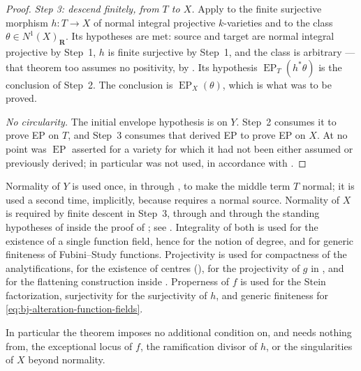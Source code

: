 \begin{proof}
\medskip
\noindent\emph{Step 3: descend finitely, from $T$ to $X$.}
Apply  to the finite surjective morphism
$h:T\to X$ of normal integral projective $k$-varieties and to the class
$\theta\in N^1(X)_{\mathbf R}$.  Its hypotheses are met: source and target
are normal integral projective by Step~1, $h$ is finite surjective by
Step~1, and the class is arbitrary --- that theorem too assumes no
positivity, by .  Its hypothesis
$\operatorname{EP}_T(h^*\theta)$ is the conclusion of Step~2.  The
conclusion is $\operatorname{EP}_X(\theta)$, which is what was to be
proved.

\medskip
\noindent\emph{No circularity.}  The initial envelope hypothesis is on $Y$.
Step~2 consumes it to prove EP on $T$, and Step~3 consumes that derived
EP to prove EP on $X$.  At no point was $\operatorname{EP}$ asserted for a variety
for which it had not been either assumed or previously derived; in
particular  was not used, in accordance with
.
\end{proof}

\begin{remark}
\label{rem:ch42-descent-hypothesis-map}
Normality of $Y$ is used once, in  through
, to make the middle term $T$ normal; it is
used a second time, implicitly, because
 requires a normal source.  Normality of
$X$ is required by finite descent in Step~3, through
 and through the standing hypotheses of
 inside the proof of
; see
.  Integrality of both is used for the
existence of a single function field, hence for the notion of degree, and
for generic finiteness of Fubini--Study functions.  Projectivity is used for
compactness of the analytifications, for the existence of centres
(), for the projectivity of $g$ in
, and for the flattening construction inside
.  Properness of $f$ is used for the Stein
factorization, surjectivity for the surjectivity of $h$, and generic
finiteness for \eqref{eq:bj-alteration-function-fields}.

In particular the theorem imposes no additional condition on, and
needs nothing from, the exceptional locus of $f$, the ramification divisor
of $h$, or the singularities of $X$ beyond normality.
\end{remark}

